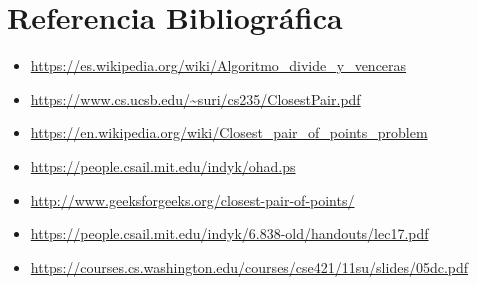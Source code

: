 \documentclass{article}
\begin{document}
\section{Referencia Bibliográfica}

	\begin{itemize}
		\item \url{https://es.wikipedia.org/wiki/Algoritmo_divide_y_venceras}	
		
		\item \url{https://www.cs.ucsb.edu/~suri/cs235/ClosestPair.pdf}	
		
		\item \url{https://en.wikipedia.org/wiki/Closest_pair_of_points_problem}
		
		\item \url{https://people.csail.mit.edu/indyk/ohad.ps}
		
		\item \url{http://www.geeksforgeeks.org/closest-pair-of-points/}	
		
		\item \url{https://people.csail.mit.edu/indyk/6.838-old/handouts/lec17.pdf}	
		
		\item \url{https://courses.cs.washington.edu/courses/cse421/11su/slides/05dc.pdf}
		
	\end{itemize}
\end{document}
